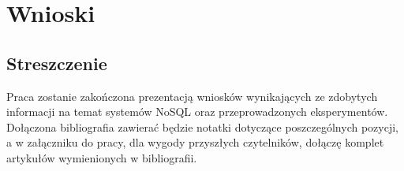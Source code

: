 \chapter{Wnioski}

\section*{Streszczenie}
Praca zostanie zakończona prezentacją wniosków wynikających ze zdobytych informacji na temat systemów NoSQL oraz przeprowadzonych eksperymentów.
Dołączona bibliografia zawierać będzie notatki dotyczące poszczególnych pozycji, a w załączniku do pracy, dla wygody przyszłych czytelników, dołączę komplet artykułów wymienionych w bibliografii.
